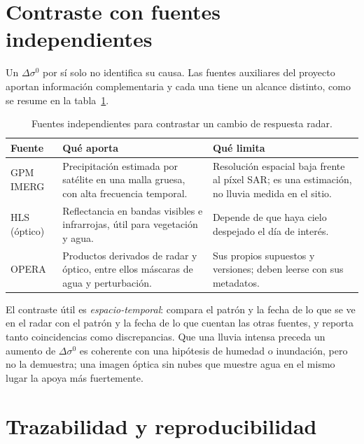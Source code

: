 \documentclass[11pt,a4paper]{article}
\begin{document}
\section{Contraste con fuentes independientes}
\label{sec:contraste}

Un $\Delta\sigma^0$ por sí solo no identifica su causa. Las fuentes auxiliares del proyecto aportan información
complementaria y cada una tiene un alcance distinto, como se resume en la tabla~\ref{tab:fuentes-aux}.

\begin{table}[htbp]
\centering\small
\begin{tabularx}{\linewidth}{p{.2\linewidth}p{.32\linewidth}X}
\toprule
\textbf{Fuente} & \textbf{Qué aporta} & \textbf{Qué limita}\\\midrule
GPM IMERG & Precipitación estimada por satélite en una malla gruesa, con alta frecuencia temporal. & Resolución espacial baja frente al píxel SAR; es una estimación, no lluvia medida en el sitio.\\
HLS (óptico) & Reflectancia en bandas visibles e infrarrojas, útil para vegetación y agua. & Depende de que haya cielo despejado el día de interés.\\
OPERA & Productos derivados de radar y óptico, entre ellos máscaras de agua y perturbación. & Sus propios supuestos y versiones; deben leerse con sus metadatos.\\\bottomrule
\end{tabularx}
\caption{Fuentes independientes para contrastar un cambio de respuesta radar.}
\label{tab:fuentes-aux}
\end{table}

El contraste útil es \emph{espacio-temporal}: compara el patrón y la fecha de lo que se ve en el radar con el
patrón y la fecha de lo que cuentan las otras fuentes, y reporta tanto coincidencias como discrepancias. Que
una lluvia intensa preceda un aumento de $\Delta\sigma^0$ es coherente con una hipótesis de humedad o
inundación, pero no la demuestra; una imagen óptica sin nubes que muestre agua en el mismo lugar la apoya más
fuertemente.

\section{Trazabilidad y reproducibilidad}
\label{sec:trazabilidad}
\end{document}
